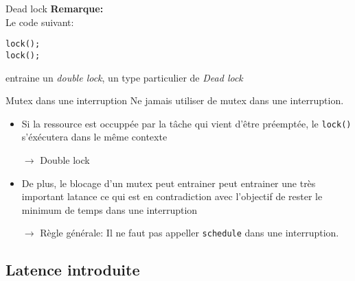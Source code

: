 \begin{frame}[fragile]{Dead lock}
  \textbf{Remarque:} \\
  Le code suivant:
  \begin{lstlisting} 
lock();
lock(); 
  \end{lstlisting} 
  entraine un  \emph{double lock},  un type particulier  de \emph{Dead
    lock}
\end{frame} 

\begin{frame}[fragile]{Mutex dans une interruption}
  Ne jamais utiliser de mutex dans une interruption.
  \begin{itemize} 
  \item Si  la ressource  est occuppée par  la tâche qui  vient d'être
    préemptée, le \texttt{lock()} s'éxécutera dans le même contexte
  \item[$\rightarrow$] Double lock
  \item De plus,  le blocage d'un mutex peut  entrainer peut entrainer
    une  très  important latance  ce  qui  est  en contradiction  avec
    l'objectif de rester le minimum de temps dans une interruption
  \item[$\rightarrow$] Règle générale: Il ne faut pas appeller \texttt{schedule} dans une interruption.
  \end{itemize} 
\end{frame} 

\subsection{Latence introduite}


